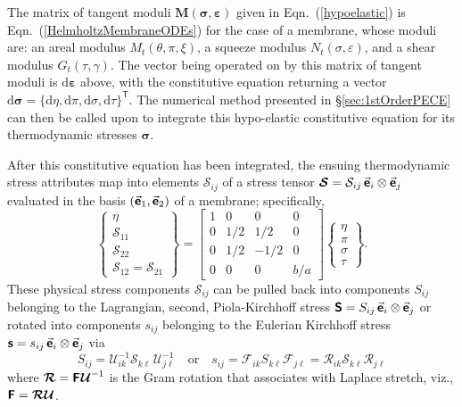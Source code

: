 The matrix of tangent moduli $\mathbf{M} ( \boldsymbol{\sigma} , \boldsymbol{\varepsilon} )$ given in Eqn.~(\ref{hypoelastic}) is Eqn.~(\ref{HelmholtzMembraneODEs}) for the case of a membrane, whose moduli are: an areal modulus $M_t (\theta , \pi , \xi)$, a squeeze modulus $N_t ( \sigma , \varepsilon )$, and a shear modulus $G_t ( \tau , \gamma )$.  The vector being operated on by this matrix of tangent moduli is $\mathrm{d} \boldsymbol{\varepsilon}$ above, with the constitutive equation returning a vector $\mathrm{d} \boldsymbol{\sigma} = \{ \mathrm{d} \eta , \mathrm{d} \pi , \mathrm{d} \sigma , \mathrm{d} \tau \}^{\mathsf{T}}$.  The numerical method presented in \S\ref{sec:1stOrderPECE} can then be called upon to integrate this hypo-elastic constitutive equation for its thermo\-dynamic stresses $\boldsymbol{\sigma}$.  

After this constitutive equation has been integrated, the ensuing thermo\-dynamic stress attributes map into elements $\mathcal{S}_{ij}$ of a stress tensor $\boldsymbol{\mathcal{S}} = \mathcal{S}_{ij} \, \vec{\boldsymbol{\mathsf{e}}}_i \otimes \vec{\boldsymbol{\mathsf{e}}}_j$ evaluated in the basis $( \vec{\boldsymbol{\mathsf{e}}}_1 , \vec{\boldsymbol{\mathsf{e}}}_2 )$ of a membrane; specifically,
\begin{equation}
   \left\{ \begin{matrix}
   \eta \\ \mathcal{S}_{11} \\ \mathcal{S}_{22} \\ \mathcal{S}_{12} = \mathcal{S}_{21}
   \end{matrix} \right\} = \begin{bmatrix}
   1 & 0 & 0 & 0 \\
   0 & 1/2 & 1/2 & 0 \\
   0 & 1/2 & -1/2 & 0 \\
   0 & 0 & 0 & b / a
   \end{bmatrix}
   \left\{ \begin{matrix}
   \eta \\ \pi \\ \sigma \\ \tau
   \end{matrix} \right\} .
\end{equation}
These physical stress components $\mathcal{S}_{ij}$ can be pulled back into components $S_{ij}$ belonging to the Lagrangian, second, Piola-Kirchhoff stress $\boldsymbol{\mathsf{S}} = S_{ij} \, \vec{\boldsymbol{\mathsf{e}}}_i \otimes \vec{\boldsymbol{\mathsf{e}}}_j$ or rotated into components $s_{ij}$ belonging to the Eulerian Kirchhoff stress $\boldsymbol{\mathsf{s}} = s_{ij} \, \vec{\boldsymbol{\mathsf{e}}}_i \otimes \vec{\boldsymbol{\mathsf{e}}}_j$ via 
\begin{equation}
    S_{ij} = \mathcal{U}^{-1}_{ik} \mathcal{S}_{k\ell\,} \mathcal{U}^{-1}_{j\ell}
    \quad \text{or} \quad
    s_{ij} = \mathcal{F}_{ik} S_{k\ell} \mathcal{F}_{j\ell} = 
    \mathcal{R}_{ik} \mathcal{S}_{k\ell} \mathcal{R}_{j\ell}
    \label{membraneStresses}
\end{equation}
where $\boldsymbol{\mathcal{R}} = \boldsymbol{\mathsf{F}} \hspace{0.5pt} \boldsymbol{\mathcal{U}}^{-1}$ is the Gram rotation that associates with Laplace stretch, viz., $\boldsymbol{\mathsf{F}} = \boldsymbol{\mathcal{RU}}$. 

